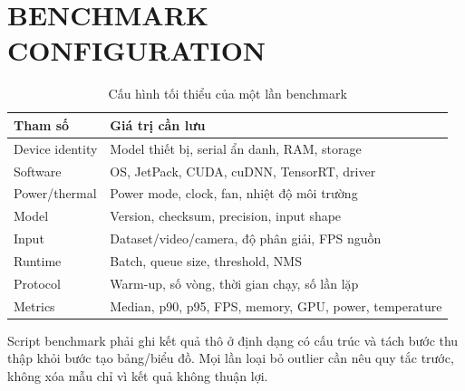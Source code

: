\chapter{BENCHMARK CONFIGURATION}

\begin{table}[H]
\centering
\caption{Cấu hình tối thiểu của một lần benchmark}
\label{tab:benchmark-config}
\begin{tabularx}{\textwidth}{L{5cm}Y}
\toprule
\textbf{Tham số} & \textbf{Giá trị cần lưu}\\
\midrule
Device identity & Model thiết bị, serial ẩn danh, RAM, storage\\
Software & OS, JetPack, CUDA, cuDNN, TensorRT, driver\\
Power/thermal & Power mode, clock, fan, nhiệt độ môi trường\\
Model & Version, checksum, precision, input shape\\
Input & Dataset/video/camera, độ phân giải, FPS nguồn\\
Runtime & Batch, queue size, threshold, NMS\\
Protocol & Warm-up, số vòng, thời gian chạy, số lần lặp\\
Metrics & Median, p90, p95, FPS, memory, GPU, power, temperature\\
\bottomrule
\end{tabularx}
\end{table}

Script benchmark phải ghi kết quả thô ở định dạng có cấu trúc và tách bước thu
thập khỏi bước tạo bảng/biểu đồ. Mọi lần loại bỏ outlier cần nêu quy tắc trước,
không xóa mẫu chỉ vì kết quả không thuận lợi.